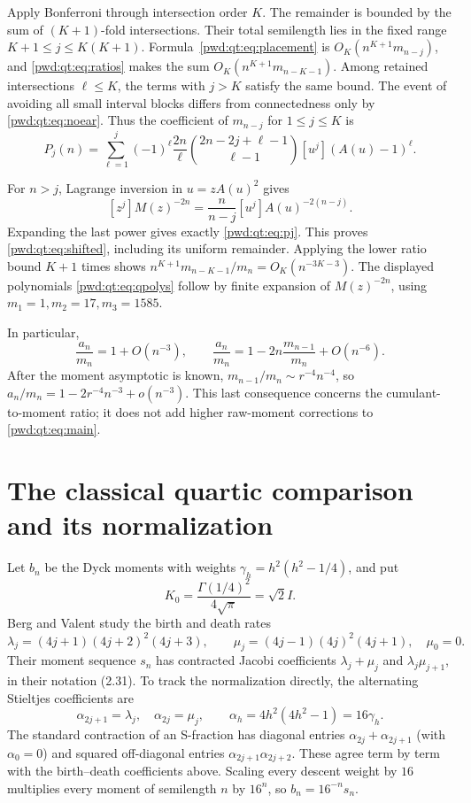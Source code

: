 \documentclass[11pt,letterpaper]{article}
\numberwithin{equation}{section}
\theoremstyle{remark}\newtheorem{remark}[theorem]{Remark}
\begin{document}
Apply Bonferroni through intersection order $K$. The remainder is bounded by the sum of $(K+1)$-fold intersections. Their total semilength lies in the fixed range $K+1\le j\le K(K+1)$. Formula~\eqref{pwd:qt:eq:placement} is $O_K(n^{K+1}m_{n-j})$, and \eqref{pwd:qt:eq:ratios} makes the sum $O_K(n^{K+1}m_{n-K-1})$. Among retained intersections $\ell\le K$, the terms with $j>K$ satisfy the same bound. The event of avoiding all small interval blocks differs from connectedness only by \eqref{pwd:qt:eq:noear}. Thus the coefficient of $m_{n-j}$ for $1\le j\le K$ is
\begin{equation}\label{pwd:qt:eq:pj}
 P_j(n)=\sum_{\ell=1}^j(-1)^\ell\frac{2n}{\ell}
 \binom{2n-2j+\ell-1}{\ell-1}[u^j](A(u)-1)^\ell.
\end{equation}

For $n>j$, Lagrange inversion in $u=zA(u)^2$ gives
\[
 [z^j]M(z)^{-2n}
 =\frac{n}{n-j}[u^j]A(u)^{-2(n-j)}.
\]
Expanding the last power gives exactly \eqref{pwd:qt:eq:pj}. This proves \eqref{pwd:qt:eq:shifted}, including its uniform remainder. Applying the lower ratio bound $K+1$ times shows
$n^{K+1}m_{n-K-1}/m_n=O_K(n^{-3K-3})$. The displayed polynomials \eqref{pwd:qt:eq:qpolys} follow by finite expansion of $M(z)^{-2n}$, using $m_1=1,m_2=17,m_3=1585$.

In particular,
\begin{equation}\label{pwd:qt:eq:cumulant-transfer}
 \frac{a_n}{m_n}=1+O(n^{-3}),\qquad
 \frac{a_n}{m_n}=1-2n\frac{m_{n-1}}{m_n}+O(n^{-6}).
\end{equation}
After the moment asymptotic is known, $m_{n-1}/m_n\sim r^{-4}n^{-4}$, so $a_n/m_n=1-2r^{-4}n^{-3}+o(n^{-3})$. This last consequence concerns the cumulant-to-moment ratio; it does not add higher raw-moment corrections to \eqref{pwd:qt:eq:main}.

\section{The classical quartic comparison and its normalization}\label{pwd:qt:sec:classical}
Let $b_n$ be the Dyck moments with weights $\gamma_h=h^2(h^2-1/4)$, and put
\begin{equation}\label{pwd:qt:eq:k0}
 K_0=\frac{\Gamma(1/4)^2}{4\sqrt\pi}=\sqrt2 I.
\end{equation}
Berg and Valent \cite[Eq.~(3.1), Prop.~3.6.1]{bergvalent} study the birth and death rates
\[
 \lambda_j=(4j+1)(4j+2)^2(4j+3),\qquad
 \mu_j=(4j-1)(4j)^2(4j+1),\quad \mu_0=0.
\]
Their moment sequence $s_n$ has contracted Jacobi coefficients
$\lambda_j+\mu_j$ and $\lambda_j\mu_{j+1}$, in their notation (2.31).
To track the normalization directly, the alternating Stieltjes coefficients are
\[
 \alpha_{2j+1}=\lambda_j,\quad \alpha_{2j}=\mu_j,
 \qquad \alpha_h=4h^2(4h^2-1)=16\gamma_h.
\]
The standard contraction of an S-fraction has diagonal entries
$\alpha_{2j}+\alpha_{2j+1}$ (with $\alpha_0=0$) and squared off-diagonal entries
$\alpha_{2j+1}\alpha_{2j+2}$. These agree term by term with the birth--death coefficients above. Scaling every descent weight by $16$ multiplies every moment of semilength $n$ by $16^n$, so $b_n=16^{-n}s_n$.
\end{document}
